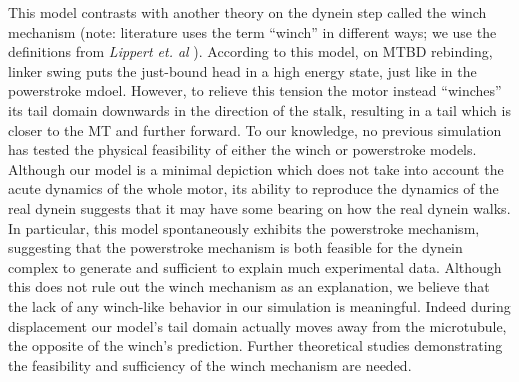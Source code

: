 \documentclass[9pt,twocolumn,twoside]{article}
\begin{document}
This model contrasts with another theory on the dynein step called the winch mechanism \cite{carterwinch, uenoem, sarlahmodel, nicastro, kinoshitaPSwinch, lippert} (note: literature uses the term ``winch'' in different ways; we use the definitions from \textit{Lippert et. al} \cite{lippert}). According to this model, on MTBD rebinding, linker swing puts the just-bound head in a high energy state, just like in the powerstroke mdoel. However, to relieve this tension the motor instead ``winches'' its tail domain downwards in the direction of the stalk, resulting in a tail which is closer to the MT and further forward. To our knowledge, no previous simulation has tested the physical feasibility of either the winch or powerstroke models. Although our model is a minimal depiction which does not take into account the acute dynamics of the whole motor, its ability to reproduce the dynamics of the real dynein suggests that it may have some bearing on how the real dynein walks. In particular, this model spontaneously exhibits the powerstroke mechanism, suggesting that the powerstroke mechanism is both feasible for the dynein complex to generate and sufficient to explain much experimental data. Although this does not rule out the winch mechanism as an explanation, we believe that the lack of any winch-like behavior in our simulation is meaningful. Indeed during displacement our model's tail domain actually moves away from the microtubule, the opposite of the winch's prediction. Further theoretical studies demonstrating the feasibility and sufficiency of the winch mechanism are needed.
\end{document}
